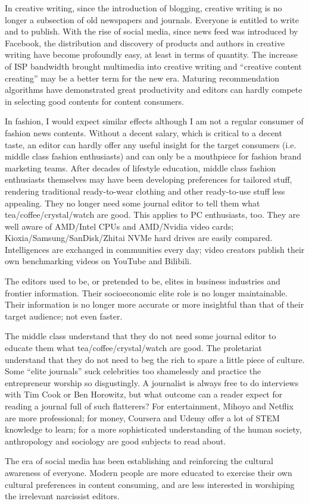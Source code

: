 \begin{multicols*}{2}
    In creative writing, since the introduction of blogging,
    creative writing is no longer a subsection of old newspapers and journals.
    Everyone is entitled to write and to publish.
    With the rise of social media, since news feed was introduced by Facebook,
    the distribution and discovery of products and authors in creative writing have become profoundly easy,
    at least in terms of quantity.
    The increase of ISP bandwidth brought multimedia into creative writing and ``creative content creating''
    may be a better term for the new era.
    Maturing recommendation algorithms have demonstrated great productivity
    and editors can hardly compete in selecting good contents for content consumers.

    In fashion, I would expect similar effects although I am not a regular consumer of fashion news contents.
    Without a decent salary, which is critical to a decent taste,
    an editor can hardly offer any useful insight for the target consumers (i.e. middle class fashion enthusiasts)
    and can only be a mouthpiece for fashion brand marketing teams.
    After decades of lifestyle education, middle class fashion enthusiasts themselves
    may have been developing preferences for tailored stuff,
    rendering traditional ready-to-wear clothing and other ready-to-use stuff less appealing.
    They no longer need some journal editor to tell them what tea/coffee/crystal/watch are good.
    This applies to PC enthusiasts, too.
    They are well aware of AMD/Intel CPUs and AMD/Nvidia video cards;
    Kioxia/Samsung/SanDisk/Zhitai NVMe hard drives are easily compared.
    Intelligences are exchanged in communities every day;
    video creators publish their own benchmarking videos on YouTube and Bilibili.

    The editors used to be, or pretended to be,
    elites in business industries and frontier information.
    Their socioeconomic elite role is no longer maintainable.
    Their information is no longer more accurate or more insightful than that of their target audience;
    not even faster.


    The middle class understand that they do not need some journal editor to educate them
    what tea/coffee/crystal/watch are good.
    The proletariat understand that they do not need to beg the rich to spare a little piece of culture.
    Some ``elite journals'' suck celebrities too shamelessly and practice the entrepreneur worship so disgustingly.
    A journalist is always free to do interviews with Tim Cook or Ben Horowitz,
    but what outcome can a reader expect for reading a journal full of such flatterers?
    For entertainment, Mihoyo and Netflix are more professional;
    for money, Coursera and Udemy offer a lot of STEM knowledge to learn;
    for a more sophisticated understanding of the human society, anthropology and sociology are good subjects to read about.

    The era of social media has been establishing and reinforcing the cultural awareness of everyone.
    Modern people are more educated to exercise their own cultural preferences in content consuming,
    and are less interested in worshiping the irrelevant narcissist editors.
\end{multicols*}

